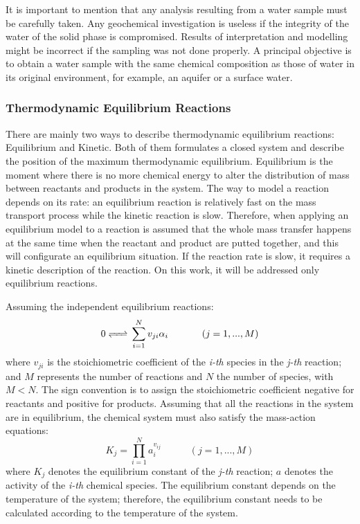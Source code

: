 \documentclass[ppgc,mestrado,english]{iiufrgs}
\begin{document}
It is important to mention that any analysis resulting from a water sample must be carefully taken. Any geochemical investigation is useless if the integrity of the water of the solid phase is compromised. Results of interpretation and modelling might be incorrect if the sampling was not done properly. A principal objective is to obtain a water sample with the same chemical composition as those of water in its original environment, for example, an aquifer or a surface water. \cite{Deutsch:97}

\subsubsection{Thermodynamic Equilibrium Reactions}
There are mainly two ways to describe thermodynamic equilibrium reactions: Equilibrium and Kinetic. Both of them formulates a closed system and describe the position of the maximum thermodynamic equilibrium. Equilibrium is the moment where there is no more chemical energy to alter the distribution of mass between reactants and products in the system. The way to model a reaction depends on its rate: an equilibrium reaction is relatively fast on the mass transport process while the kinetic reaction is slow. Therefore, when applying an equilibrium model to a reaction is assumed that the whole mass transfer happens at the same time when the reactant and product are putted together, and this will configurate an equilibrium situation. If the reaction rate is slow, it requires a kinetic description of the reaction. On this work, it will be addressed only equilibrium reactions.  \cite{Nordstrom:86}

Assuming the independent equilibrium reactions:
\begin{equation}\label{reaction}
0 \ce{<=>} \sum\limits_{i=1}^N  v_{ji} \alpha_i \hspace{35pt}    (j = 1, ... , M)
\end{equation}
where $v_{ji}$ is the stoichiometric coefficient of the \emph{i-th} species in the \emph{j-th} reaction; and $M$ represents the number of reactions and $N$ the number of species, with $M < N$. The sign convention is to assign the stoichiometric coefficient negative for reactants and positive for products. Assuming that all the reactions in the system are in equilibrium, the chemical system must also satisfy the mass-action equations:
\begin{equation}\label{equilibrium_reaction}
K_j =  \prod\limits_{i=1}^N  a_i^{v_{ij}} \hspace{35pt}    (j = 1, ... , M)
\end{equation}
where $K_j$ denotes the equilibrium constant of the \emph{j-th} reaction; $a$ denotes the activity of the \emph{i-th} chemical species. The equilibrium constant depends on the temperature of the system; therefore, the equilibrium constant needs to be calculated according to the temperature of the system. 
\end{document}
